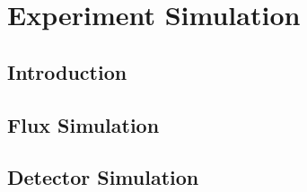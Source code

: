 \chapter{Experiment Simulation}
\label{ch:Simulation}

\section{Introduction}

\section{Flux Simulation}

\section{Detector Simulation}